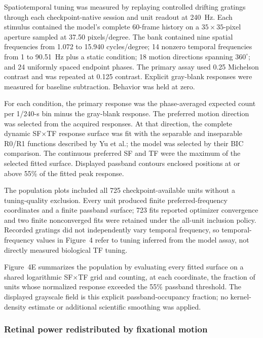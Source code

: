 \documentclass{lite}
\begin{document}
Spatiotemporal tuning was measured by replaying controlled drifting gratings through each checkpoint-native session and unit readout at 240~Hz. Each stimulus contained the model's complete 60-frame history on a $35\times35$-pixel aperture sampled at 37.50 pixels/degree. The bank contained nine spatial frequencies from 1.072 to 15.940 cycles/degree; 14 nonzero temporal frequencies from 1 to 90.51~Hz plus a static condition; 18 motion directions spanning $360^\circ$; and 24 uniformly spaced endpoint phases. The primary assay used 0.25 Michelson contrast and was repeated at 0.125 contrast. Explicit gray-blank responses were measured for baseline subtraction. Behavior was held at zero.

For each condition, the primary response was the phase-averaged expected count per 1/240-s bin minus the gray-blank response. The preferred motion direction was selected from the acquired responses. At that direction, the complete dynamic SF$\times$TF response surface was fit with the separable and inseparable R0/R1 functions described by Yu et al.; the model was selected by their BIC comparison. The continuous preferred SF and TF were the maximum of the selected fitted surface. Displayed passband contours enclosed positions at or above 55\% of the fitted peak response.

The population plots included all 725 checkpoint-available units without a tuning-quality exclusion. Every unit produced finite preferred-frequency coordinates and a finite passband surface; 723 fits reported optimizer convergence and two finite nonconverged fits were retained under the all-unit inclusion policy. Recorded gratings did not independently vary temporal frequency, so temporal-frequency values in Figure~4 refer to tuning inferred from the model assay, not directly measured biological TF tuning.

Figure~4E summarizes the population by evaluating every fitted surface on a shared logarithmic SF$\times$TF grid and counting, at each coordinate, the fraction of units whose normalized response exceeded the 55\% passband threshold. The displayed grayscale field is this explicit passband-occupancy fraction; no kernel-density estimate or additional scientific smoothing was applied.

\subsubsection{Retinal power redistributed by fixational motion}
\end{document}
